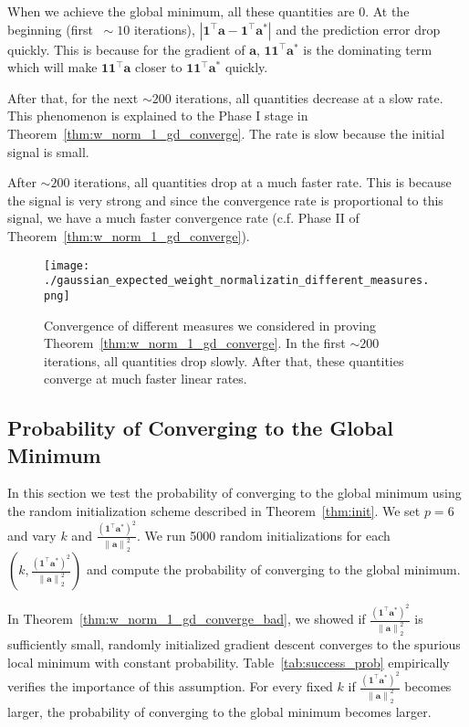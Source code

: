 \documentclass{article}
\newcommand{\secondlayer}{a}
\newcommand{\vect}[1]{\mathbf{#1}}
\newcommand{\norm}[1]{\left\|#1\right\|}
\newcommand{\abs}[1]{\left|#1\right|}
\begin{document}
When we achieve the global minimum, all these quantities are $0$.
At the beginning (first $~\sim 10$ iterations), $\abs{\vect{1}^\top \vect{\secondlayer}-\vect{1}^\top \vect{\secondlayer}^*}$ and the prediction error drop quickly.
This is because for the gradient of $\vect{\secondlayer}$, $\vect{1}\vect{1}^\top\vect{\secondlayer}^*$ is the dominating term which will make $\vect{1}\vect{1}^\top\vect{\secondlayer}$ closer to  $\vect{1}\vect{1}^\top\vect{\secondlayer}^*$ quickly.

After that, for the next $\sim 200$ iterations, all quantities decrease at a slow rate.
This phenomenon is explained to the Phase I stage in Theorem~\ref{thm:w_norm_1_gd_converge}.
The rate is slow because the initial signal is small.

After $\sim 200$ iterations, all quantities drop at a much faster rate.
This is because the signal is very strong and since the convergence rate is proportional to this signal, we have a much faster convergence rate (c.f. Phase II of Theorem~\ref{thm:w_norm_1_gd_converge}).

\begin{figure}[tb]
\centering
\texttt{[image: ./gaussian\_expected\_weight\_normalizatin\_different\_measures.png]}
	\caption{Convergence of different measures we considered in proving Theorem~\ref{thm:w_norm_1_gd_converge}.
	In the first $\sim200$ iterations, all quantities drop slowly.
	After that, these quantities converge at much faster linear rates.
}\label{fig:dynamics}
\end{figure}\subsection{Probability of Converging to the Global Minimum}
In this section we test the probability of converging to the global minimum using the random initialization scheme described in Theorem~\ref{thm:init}.
We set $p=6$ and vary $k$ and $\frac{(\vect{1}^\top\vect{\secondlayer}^*)^2}{\norm{\vect{\secondlayer}}_2^2}$.
We run 5000 random initializations for each $(k,\frac{(\vect{1}^\top\vect{\secondlayer}^*)^2}{\norm{\vect{\secondlayer}}_2^2})$ and compute the probability of converging to the global minimum.

In Theorem~\ref{thm:w_norm_1_gd_converge_bad}, we showed if $\frac{(\vect{1}^\top\vect{\secondlayer}^*)^2}{\norm{\vect{\secondlayer}}_2^2}$ is sufficiently small, randomly initialized gradient descent converges to the spurious local minimum with constant probability.
Table~\ref{tab:success_prob} empirically verifies the importance of this assumption.
For every fixed $k$ if  $\frac{(\vect{1}^\top\vect{\secondlayer}^*)^2}{\norm{\vect{\secondlayer}}_2^2}$ becomes larger, the probability of converging to the global minimum becomes larger. 
\end{document}
